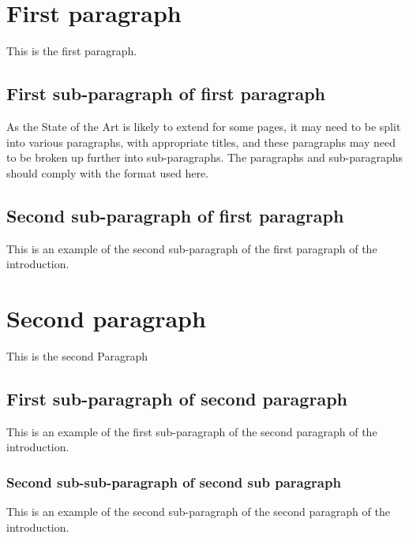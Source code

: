 \section{First paragraph}

This is the first paragraph.

\subsection{First sub-paragraph of first paragraph}

As the State of the Art is likely to extend for some pages, it may need to be split into various paragraphs, with appropriate titles, and these paragraphs may need to be broken up further into sub-paragraphs. The paragraphs and sub-paragraphs should comply with the format used here.

\subsection{Second sub-paragraph of first paragraph}

This is an example of the second sub-paragraph of the first paragraph of the introduction.

\section{Second paragraph}

This is the second Paragraph

\subsection{First sub-paragraph of second paragraph}
This is an example of the first sub-paragraph of the second paragraph of the introduction.

\subsubsection{Second sub-sub-paragraph of second sub paragraph}
This is an example of the second sub-paragraph of the second paragraph of the introduction.